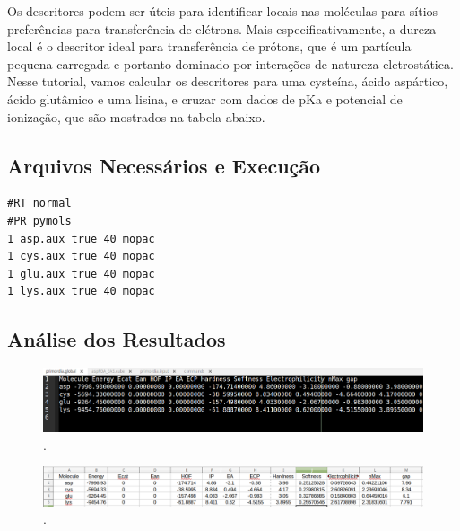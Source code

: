 \documentclass[a4paper,11pt]{refart}
\begin{document}
Os descritores podem ser úteis para identificar locais nas moléculas para sítios preferências para transferência de elétrons. Mais especificativamente, a dureza local é o descritor ideal para transferência de prótons, que é um partícula pequena carregada e portanto dominado por interações de natureza eletrostática. Nesse tutorial, vamos calcular os descritores para uma cysteína, ácido aspártico, ácido glutâmico e uma lisina, e cruzar com dados de pKa e potencial de ionização, que são mostrados na tabela abaixo.


\subsection{Arquivos Necessários e Execução}

\hspace*{-\leftmarginwidth}
\begin{minipage}{\fullwidth}
\begin{lstlisting}[caption={Input editado para execução do tutorial 3},label={tut402}]
#RT normal 
#PR pymols
1 asp.aux true 40 mopac
1 cys.aux true 40 mopac
1 glu.aux true 40 mopac
1 lys.aux true 40 mopac
\end{lstlisting}
\end{minipage}

\subsection{Análise dos Resultados}



\hspace*{-\leftmarginwidth}
\begin{minipage}{\fullwidth}
	\begin{figure}[H]
		\begin{center}
			\includegraphics[width=6in]{images/tut4_img3}
			\caption{.}
			\label{fig_tut4_1}
		\end{center}
	\end{figure}
\end{minipage}

\hspace*{-\leftmarginwidth}
\begin{minipage}{\fullwidth}
	\begin{figure}[H]
		\begin{center}
			\includegraphics[width=6in]{images/tut4_img4}
			\caption{.}
			\label{fig_tut4_2}
		\end{center}
	\end{figure}
\end{minipage}
\end{document}
